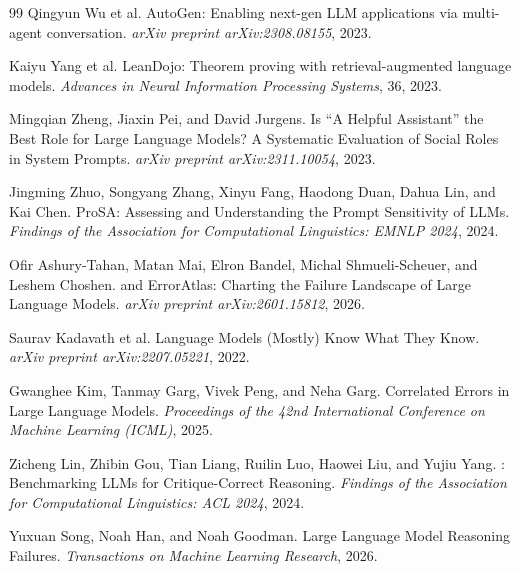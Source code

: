 \documentclass[11pt]{article}
\begin{document}
\begin{thebibliography}{99}
Qingyun Wu et al.
\newblock AutoGen: Enabling next-gen LLM applications via multi-agent conversation.
\newblock \emph{arXiv preprint arXiv:2308.08155}, 2023.

Kaiyu Yang et al.
\newblock LeanDojo: Theorem proving with retrieval-augmented language models.
\newblock \emph{Advances in Neural Information Processing Systems}, 36, 2023.

Mingqian Zheng, Jiaxin Pei, and David Jurgens.
\newblock Is ``A Helpful Assistant'' the Best Role for Large Language Models? A Systematic
Evaluation of Social Roles in System Prompts.
\newblock \emph{arXiv preprint arXiv:2311.10054}, 2023.

Jingming Zhuo, Songyang Zhang, Xinyu Fang, Haodong Duan, Dahua Lin, and Kai Chen.
\newblock ProSA: Assessing and Understanding the Prompt Sensitivity of LLMs.
\newblock \emph{Findings of the Association for Computational Linguistics: EMNLP 2024}, 2024.

Ofir Ashury-Tahan, Matan Mai, Elron Bandel, Michal Shmueli-Scheuer, and Leshem Choshen.
 and {ErrorAtlas}: Charting the Failure Landscape of Large Language
Models.
\newblock \emph{arXiv preprint arXiv:2601.15812}, 2026.

Saurav Kadavath et al.
\newblock Language Models (Mostly) Know What They Know.
\newblock \emph{arXiv preprint arXiv:2207.05221}, 2022.

Gwanghee Kim, Tanmay Garg, Vivek Peng, and Neha Garg.
\newblock Correlated Errors in Large Language Models.
\newblock \emph{Proceedings of the 42nd International Conference on Machine Learning
(ICML)}, 2025.

Zicheng Lin, Zhibin Gou, Tian Liang, Ruilin Luo, Haowei Liu, and Yujiu Yang.
: Benchmarking {LLMs} for Critique-Correct Reasoning.
\newblock \emph{Findings of the Association for Computational Linguistics: ACL 2024}, 2024.

Yuxuan Song, Noah Han, and Noah Goodman.
\newblock Large Language Model Reasoning Failures.
\newblock \emph{Transactions on Machine Learning Research}, 2026.

\end{thebibliography}
\end{document}
